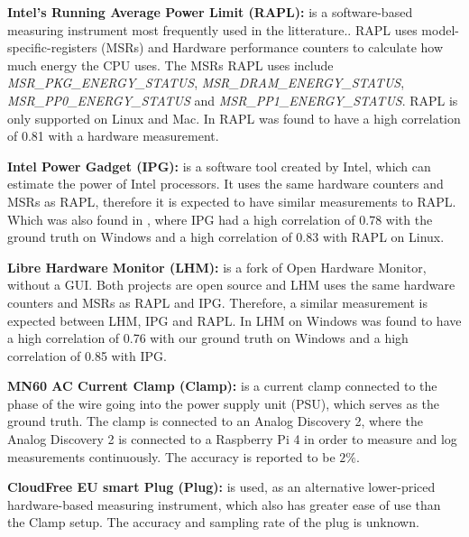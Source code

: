 \noindent\textbf{Intel's Running Average Power Limit (RAPL):} is a software-based measuring instrument most frequently used in the litterature.\cite{biksbois}. RAPL uses model-specific-registers (MSRs) and Hardware performance counters to calculate how much energy the CPU uses. The MSRs RAPL uses include \textit{MSR\_PKG\_ENERGY\_STATUS}, \textit{MSR\_DRAM\_ENERGY\_STATUS}, \textit{MSR\_PP0\_ENERGY\_STATUS} and \textit{MSR\_PP1\_ENERGY\_STATUS}. %
RAPL is only supported on Linux and Mac. In \cite{biksbois} RAPL was found to have a high correlation of 0.81 with a hardware measurement.\cite{biksbois}\newline

\noindent\textbf{Intel Power Gadget (IPG):} is a software tool created by Intel, which can estimate the power of Intel processors. %
It uses the same hardware counters and MSRs as RAPL\cite{FireFox}, therefore it is expected to have similar measurements to RAPL. Which was also found in \cite{biksbois}, where IPG had a high correlation of 0.78 with the ground truth on Windows and a high correlation of 0.83 with RAPL on Linux.\cite{biksbois}\newline





\noindent\textbf{Libre Hardware Monitor (LHM):} is a fork of Open Hardware Monitor, without a GUI.\cite{LHM} Both projects are open source and LHM uses the same hardware counters and MSRs as RAPL and IPG. %
Therefore, a similar measurement is expected between LHM, IPG and RAPL. In \cite{biksbois} LHM on Windows was found to have a high correlation of 0.76 with our ground truth on Windows and a high correlation of 0.85 with IPG.\newline

\noindent\textbf{MN60 AC Current Clamp (Clamp):} is a current clamp connected to the phase of the wire going into the power supply unit (PSU), which serves as the ground truth. The clamp is connected to an Analog Discovery 2, where the Analog Discovery 2 is connected to a Raspberry Pi 4 in order to measure and log measurements continuously.\cite{biksbois} The accuracy is reported to be $2\%$\cite{ClampDoc}.\newline

\noindent\textbf{CloudFree EU smart Plug (Plug):} is used, as an alternative lower-priced hardware-based measuring instrument, which also has greater ease of use than the Clamp setup. The accuracy and sampling rate of the plug is unknown.\cite{CloudFreeEUSMartPlug}\newline